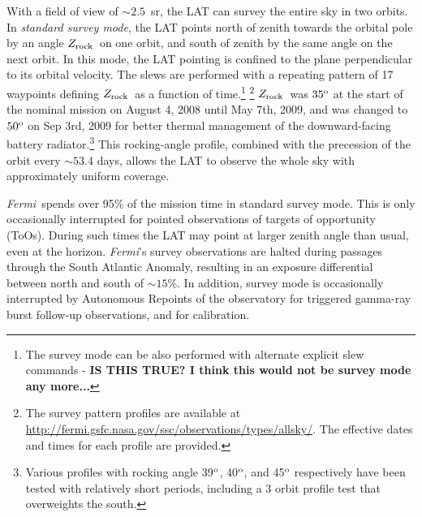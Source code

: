 \documentclass[aps,twocolumn,prd,superscriptaddress,showpacs,nofootinbib,fixfloat]{revtex4}
\newcommand{\Fermi}{{\slshape Fermi}}
\newcommand{\degree}{^{\rm o}}
\newcommand{\zrock}{$Z_{\rm rock}$}
\begin{document}



With a field of view of $\sim2.5$~sr, the LAT can survey the entire sky
in two orbits.  In \emph{standard survey mode}, the LAT points north of zenith
towards the orbital pole
by an angle \zrock\ on one orbit, and south of zenith by the same angle on the
next orbit.  In this mode, the LAT pointing is confined to the plane
perpendicular to its orbital velocity.  The slews are
performed with a repeating pattern of 17 waypoints defining
\zrock\ as a function of time.\footnote{The survey mode can
be also performed with alternate explicit slew
commands - \bf IS THIS TRUE?  I think this would not be survey mode any more...}
\footnote{The survey pattern profiles are available
at
\url{http://fermi.gsfc.nasa.gov/ssc/observations/types/allsky/}.
The effective dates and times for each profile are provided.
} \zrock\ was $35\degree$ at the start of the nominal
mission on August 4, 2008 until May 7th, 2009, and was changed
to $50\degree$ on Sep 3rd, 2009 for better thermal
management of the downward-facing battery
radiator.\footnote{Various profiles
with rocking angle 39$\degree$, 40$\degree$, and 45$\degree$
respectively have been tested with relatively short periods,
including a 3 orbit profile test that overweights the south.} 
This rocking-angle profile, combined with the precession
of the orbit every $\sim53.4$ days, allows the LAT to observe
the whole sky with approximately uniform coverage.

\Fermi\ spends over 95\% of the mission time in standard survey mode.
This is only occasionally interrupted for
pointed observations of targets of opportunity (ToOs).  During such times
the LAT may point at larger zenith angle than usual, even at the horizon.
\Fermi's survey observations are
halted during passages through the South
Atlantic Anomaly, resulting in an exposure
differential between north and south of $\sim15$\%. In addition,
survey mode is occasionally interrupted by Autonomous
Repoints of the observatory for triggered
gamma-ray burst follow-up observations, and for calibration.
\medskip
\end{document}
